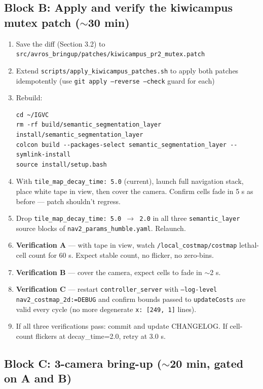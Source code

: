 \documentclass[11pt]{article}
\begin{document}
\subsection{Block B: Apply and verify the kiwicampus mutex patch ($\sim$30 min)}

\begin{enumerate}[leftmargin=2em,nosep]
\item Save the diff (Section 3.2) to \texttt{src/avros\_bringup/patches/kiwicampus\_pr2\_mutex.patch}
\item Extend \texttt{scripts/apply\_kiwicampus\_patches.sh} to apply both
  patches idempotently (use \texttt{git apply --reverse --check} guard for each)
\item Rebuild:
\begin{lstlisting}
cd ~/IGVC
rm -rf build/semantic_segmentation_layer install/semantic_segmentation_layer
colcon build --packages-select semantic_segmentation_layer --symlink-install
source install/setup.bash
\end{lstlisting}
\item With \texttt{tile\_map\_decay\_time: 5.0} (current), launch full
  navigation stack, place white tape in view, then cover the camera. Confirm
  cells fade in 5 s as before --- patch shouldn't regress.
\item Drop \texttt{tile\_map\_decay\_time: 5.0 $\to$ 2.0} in all three
  \texttt{semantic\_layer} source blocks of \texttt{nav2\_params\_humble.yaml}.
  Relaunch.
\item \textbf{Verification A} --- with tape in view, watch
  \texttt{/local\_costmap/costmap} lethal-cell count for 60 s. Expect stable
  count, no flicker, no zero-bins.
\item \textbf{Verification B} --- cover the camera, expect cells to fade in
  $\sim$2 s.
\item \textbf{Verification C} --- restart \texttt{controller\_server} with
  \texttt{--log-level nav2\_costmap\_2d:=DEBUG} and confirm bounds passed to
  \texttt{updateCosts} are valid every cycle (no more degenerate
  \texttt{x: [249, 1]} lines).
\item If all three verifications pass: commit and update CHANGELOG. If
  cell-count flickers at decay\_time=2.0, retry at 3.0 s.
\end{enumerate}

\subsection{Block C: 3-camera bring-up ($\sim$20 min, gated on A and B)}
\end{document}
